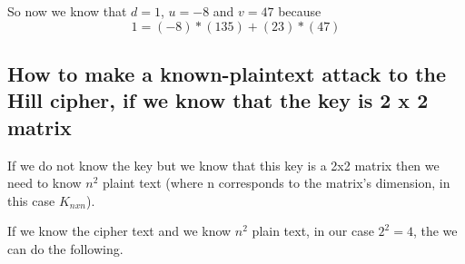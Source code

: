 \documentclass[titlepage, 12pt]{article}
\numberwithin{equation}{section}%
\numberwithin{figure}{section}%
\numberwithin{table}{section}%
\begin{document}
		So now we know that $d=1$, $u=-8$ and $v=47$ because\newline
		\begin{equation}
			1 = (-8)*(135) + (23)*(47)
		\end{equation}
		\subsection{How to make a known-plaintext attack to the Hill cipher, if we know that the key is 2 x 2 matrix}
		
		If we do not know the key but we know that this key is a 2x2 matrix then we need to know $n^{2}$ plaint text (where n corresponds to the matrix's dimension, in this case $K_{nxn}$).\cite{hill} \bigskip
		
		If we know the cipher text and we know $n^{2}$ plain text, in our case $2^{2}=4$, the we can do the following. \bigskip
		
\end{document}
